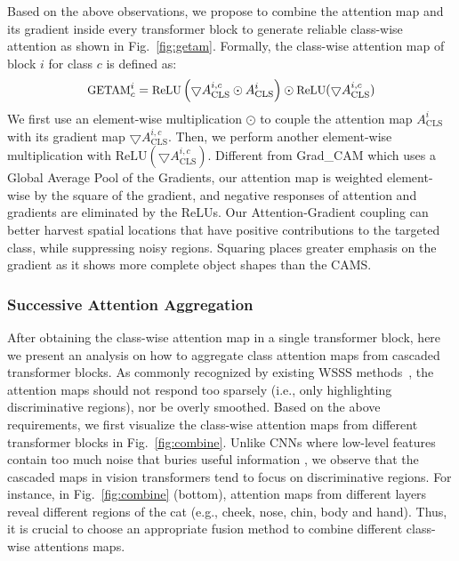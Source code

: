 \documentclass[10pt,twocolumn,letterpaper]{article}
\begin{document}
Based on the above observations, we propose to combine the attention map and its gradient inside every transformer block to generate reliable class-wise attention as shown in Fig.~\ref{fig:getam}.
Formally, the class-wise attention map of block $i$ for class $c$ is defined as:
\begin{equation}
\small
\text{GETAM}_c^i = \text{ReLU}\left(\bigtriangledown A_{\text{CLS}}^{i,c} \odot A_{\text{CLS}}^{i}\right) \odot \text{ReLU}(\bigtriangledown A_{\text{CLS}}^{i,c})
\end{equation}
\noindent
We first use an element-wise multiplication $\odot$ to couple the attention map $A_{\text{CLS}}^{i}$ with its gradient map $\bigtriangledown A_{\text{CLS}}^{i,c}$.
Then, we perform another element-wise multiplication with $\text{ReLU}(\bigtriangledown A_{\text{CLS}}^{i,c})$. 
Different from Grad\_CAM which uses a Global Average Pool of the Gradients, 
our attention map is weighted element-wise by the square of the gradient, and negative responses of attention and gradients are eliminated by the ReLUs. 
Our Attention-Gradient coupling can better harvest spatial locations that have positive contributions to the targeted class, while suppressing noisy regions. Squaring places greater emphasis on the gradient as it shows more complete object shapes than the CAMS.


\subsubsection{Successive Attention Aggregation}
After obtaining the class-wise attention map in a single transformer block, here we present an analysis on how to aggregate class attention maps from cascaded transformer blocks. 
As commonly recognized by existing WSSS methods~\cite{sun2022inferring,Sun_2021_ICCV,Sun_2021_ICCV,Zhang_2021_ICCV,wang2020self}, the attention maps should not respond too sparsely (i.e., only highlighting discriminative regions), nor be overly smoothed.
Based on the above requirements, we first visualize the class-wise attention maps from different transformer blocks in Fig.~\ref{fig:combine}.
Unlike CNNs where low-level features contain too much noise that buries useful information \cite{wei2021shallow,jiang2021layercam}, we observe that the cascaded maps in vision transformers tend to focus on discriminative regions. For instance, in Fig.~\ref{fig:combine} (bottom), attention maps from different layers reveal different regions of the cat (e.g., cheek, nose, chin, body and hand).
Thus, it is crucial to choose an appropriate fusion method to combine different class-wise attentions maps.
\end{document}
